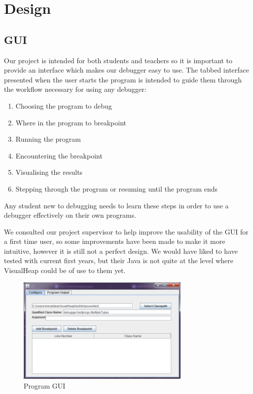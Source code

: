 \documentclass[11pt, a4paper]{report}
\begin{document}
\chapter{Design}

\section{GUI}

Our project is intended for both students and teachers so it is important to provide an interface which makes our debugger easy to use. The tabbed interface presented when the user starts the program is intended to guide them through the workflow necessary for using any debugger:

\begin{enumerate}

  \item Choosing the program to debug
  \item Where in the program to breakpoint
  \item Running the program
  \item Encountering the breakpoint
  \item Visualising the results
  \item Stepping through the program or resuming until the program ends
  
\end{enumerate}

Any student new to debugging needs to learn these steps in order to use a debugger effectively on their own programs.

We consulted our project supervisor to help improve the usability of the GUI for a first time user, so some improvements have been made to make it more intuitive, however it is still not a perfect design. We would have liked to have tested with current first years, but their Java is not quite at the level where VisualHeap could be of use to them yet. 

\begin{figure}[h]
        \centering
        \includegraphics[width=0.75\textwidth]{images/final/gui.png}
        \caption{Program GUI}
\end{figure}
\end{document}
